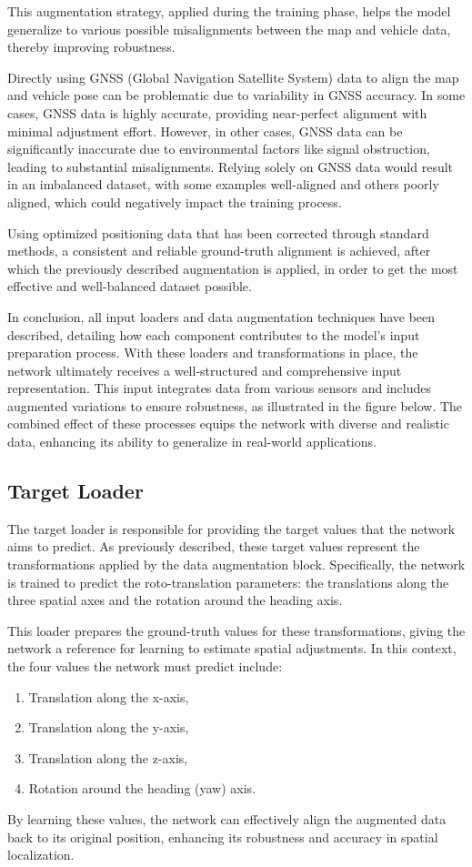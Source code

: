 This augmentation strategy, applied during the training phase, helps the model generalize to various possible misalignments between the map and vehicle data, thereby improving robustness.

Directly using GNSS (Global Navigation Satellite System) data to align the map and vehicle pose can be problematic due to variability in GNSS accuracy. In some cases, GNSS data is highly accurate, providing near-perfect alignment with minimal adjustment effort. However, in other cases, GNSS data can be significantly inaccurate due to environmental factors like signal obstruction, leading to substantial misalignments. Relying solely on GNSS data would result in an imbalanced dataset, with some examples well-aligned and others poorly aligned, which could negatively impact the training process.

Using optimized positioning data that has been corrected through standard methods, a consistent and reliable ground-truth alignment is achieved, after which the previously described augmentation is applied, in order to get the most effective and well-balanced dataset possible.

In conclusion, all input loaders and data augmentation techniques have been described, detailing how each component contributes to the model's input preparation process. With these loaders and transformations in place, the network ultimately receives a well-structured and comprehensive input representation. This input integrates data from various sensors and includes augmented variations to ensure robustness, as illustrated in the figure below. The combined effect of these processes equips the network with diverse and realistic data, enhancing its ability to generalize in real-world applications.

\subsection{Target Loader}
The target loader is responsible for providing the target values that the network aims to predict. As previously described, these target values represent the transformations applied by the data augmentation block. Specifically, the network is trained to predict the roto-translation parameters: the translations along the three spatial axes and the rotation around the heading axis.

This loader prepares the ground-truth values for these transformations, giving the network a reference for learning to estimate spatial adjustments. In this context, the four values the network must predict include:
\begin{enumerate}
    \item Translation along the x-axis,
    \item Translation along the y-axis,
    \item Translation along the z-axis, 
    \item Rotation around the heading (yaw) axis.
\end{enumerate}
By learning these values, the network can effectively align the augmented data back to its original position, enhancing its robustness and accuracy in spatial localization.

